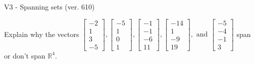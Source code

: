 \begin{exercise}
  \begin{exerciseTitle}V3 - Spanning sets (ver. 610)\end{exerciseTitle}
  \begin{exerciseStatement}
    Explain why the vectors \(\left[\begin{array}{r}
-2 \\
1 \\
3 \\
-5
\end{array}\right] , \left[\begin{array}{r}
-5 \\
1 \\
0 \\
1
\end{array}\right] , \left[\begin{array}{r}
-1 \\
-1 \\
-6 \\
11
\end{array}\right] , \left[\begin{array}{r}
-14 \\
1 \\
-9 \\
19
\end{array}\right] , \text{ and } \left[\begin{array}{r}
-5 \\
-4 \\
-1 \\
3
\end{array}\right]\) span or don't span \(\mathbb{R}^4\). 
	



\end{exerciseStatement}
\end{exercise}
